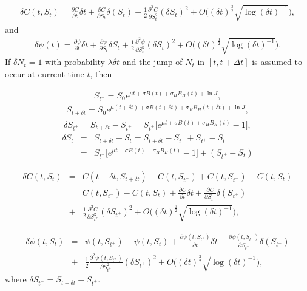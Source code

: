\documentclass[a4paper,11pt]{amsart}
\numberwithin{equation}{section}
\theoremstyle{definition}
\theoremstyle{plain}
\theoremstyle{definition}
\newcommand{\1}{\mathbf{1}}
\begin{document}
\begin{eqnarray}
\delta C(t,S_t)=\frac{\partial C}{\partial t}\delta t+\frac{\partial C}{\partial S_t}\delta (S_t)+\frac{1}{2}\frac{\partial^2C}{\partial S_t^2}(\delta S_t)^2+O\big((\delta t)^{\frac{3}{2}}\sqrt{\log (\delta t)^{-1}}\big),
\label{eq:a10}
\end{eqnarray}
and
\begin{eqnarray}
\delta \psi(t)=\frac{\partial \psi}{\partial t}\delta t+\frac{\partial \psi}{\partial S_t}\delta S_t+\frac{1}{2}\frac{\partial^2\psi}{\partial S_t^2}(\delta S_t)^2+O\big((\delta t)^{\frac{3}{2}}\sqrt{\log (\delta t)^{-1}}\big).
\label{eq:a11}
\end{eqnarray}
If $\delta N_t=1$ with probability $\lambda\delta t$ and the jump of $N_t$ in $[t,t+\Delta t]$ is assumed to occur at current time $t$, then

\begin{eqnarray}
S_{t^+}=S_0e^{\mu t+\sigma B(t)+\sigma_HB_H(t)+\ln J},
\label{eq:a12}
\end{eqnarray}
\begin{eqnarray}
S_{t+\delta t}=S_0e^{\mu (t+\delta t)+\sigma B(t+\delta t)+\sigma_HB_H(t+\delta t)+\ln J},
\label{eq:a13}
\end{eqnarray}
\begin{eqnarray}
\delta S_{t^+}=S_{t+\delta t}-S_{t^+}=S_{t^+}\big[e^{\mu t+\sigma B(t)+\sigma_HB_H(t)}-1\big],
\label{eq:a14}
\end{eqnarray}
\begin{eqnarray}
\delta S_t&=&S_{t+\delta t}-S_t=S_{t+\delta t}-S_{t^+}+S_{t^+}-S_t\nonumber\\
&=&S_{t^+}\big[e^{\mu t+\sigma B(t)+\sigma_HB_H(t)}-1\big]+(S_{t^+}-S_t)
\label{eq:a15}
\end{eqnarray}

\begin{eqnarray}
\delta C(t,S_t)&=&C(t+\delta t,S_{t+\delta t})-C(t,S_{t^+})+C(t,S_{t^+})-C(t,S_t)\nonumber\\
&=&C(t,S_{t^+})-C(t,S_t)+\frac{\partial C}{\partial t}\delta t+\frac{\partial C}{\partial S_{t^+}}\delta (S_{t^+})\nonumber\\
&+&\frac{1}{2}\frac{\partial^2C}{\partial S_{t^+}^2}(\delta S_{t^+})^2+O\big((\delta t)^{\frac{3}{2}}\sqrt{\log (\delta t)^{-1}}\big),
\label{eq:a16}
\end{eqnarray}

\begin{eqnarray}
\delta \psi(t,S_t)&=&\psi(t,S_{t^+})-\psi(t,S_t)+\frac{\partial \psi(t,S_{t^+})}{\partial t}\delta t+\frac{\partial \psi(t,S_{t^+})}{\partial S_{t^+}}\delta (S_{t^+})\nonumber\\
&+&\frac{1}{2}\frac{\partial^2\psi(t,S_{t^+})}{\partial S_{t^+}^2}(\delta S_{t^+})^2+O\big((\delta t)^{\frac{3}{2}}\sqrt{\log (\delta t)^{-1}}\big),
\label{eq:a17}
\end{eqnarray}
where $\delta S_{t^+}=S_{t+\delta t}-S_{t^+}$.
\end{document}

